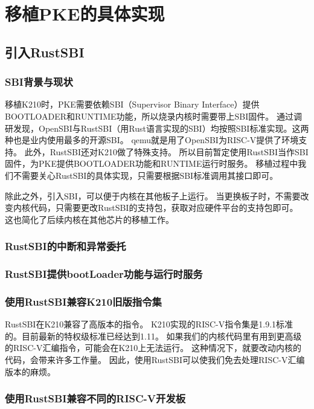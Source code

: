 \chapter{移植PKE的具体实现}

\section{引入RustSBI}

\subsection{SBI背景与现状}

移植K210时，PKE需要依赖SBI（Supervisor Binary Interface）提供BOOTLOADER和RUNTIME功能，所以烧录内核时需要带上SBI固件。
通过调研发现，OpenSBI与RustSBI（用Rust语言实现的SBI）均按照SBI标准实现。这两种也是业内使用最多的开源SBI。
qemu就是用了OpenSBI为RISC-V提供了环境支持。
此外，RustSBI还对K210做了特殊支持。
所以目前暂定使用RustSBI当作SBI固件，为PKE提供BOOTLOADER功能和RUNTIME运行时服务。
移植过程中我们不需要关心RustSBI的具体实现，只需要根据SBI标准调用其接口即可。

除此之外，引入SBI，可以便于内核在其他板子上运行。
当更换板子时，不需要改变内核代码，只需要更改RustSBI的支持包，获取对应硬件平台的支持包即可。
这也简化了后续内核在其他芯片的移植工作。

\subsection{RustSBI的中断和异常委托}

\subsection{RustSBI提供bootLoader功能与运行时服务}

\subsection{使用RustSBI兼容K210旧版指令集}

RustSBI在K210兼容了高版本的指令。
K210实现的RISC-V指令集是1.9.1标准的。目前最新的特权级标准已经达到1.11。
如果我们的内核代码里有用到更高级的RISC-V汇编指令，可能会在K210上无法运行。
这种情况下，就要改动内核的代码，会带来许多工作量。
因此，使用RustSBI可以使我们免去处理RISC-V汇编版本的麻烦。

\subsection{使用RustSBI兼容不同的RISC-V开发板}

